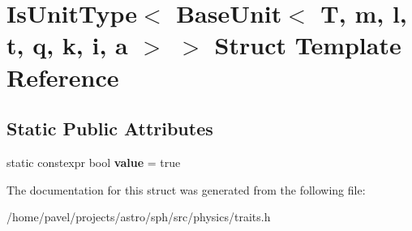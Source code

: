 \hypertarget{structIsUnitType_3_01BaseUnit_3_01T_00_01m_00_01l_00_01t_00_01q_00_01k_00_01i_00_01a_01_4_01_4}{}\section{Is\+Unit\+Type$<$ Base\+Unit$<$ T, m, l, t, q, k, i, a $>$ $>$ Struct Template Reference}
\label{structIsUnitType_3_01BaseUnit_3_01T_00_01m_00_01l_00_01t_00_01q_00_01k_00_01i_00_01a_01_4_01_4}
\subsection*{Static Public Attributes}
\begin{DoxyCompactItemize}
\item 
\hypertarget{structIsUnitType_3_01BaseUnit_3_01T_00_01m_00_01l_00_01t_00_01q_00_01k_00_01i_00_01a_01_4_01_4_a838d6c63bee6ee792d0195d20170b8f1}{}\label{structIsUnitType_3_01BaseUnit_3_01T_00_01m_00_01l_00_01t_00_01q_00_01k_00_01i_00_01a_01_4_01_4_a838d6c63bee6ee792d0195d20170b8f1} 
static constexpr bool {\bfseries value} = true
\end{DoxyCompactItemize}


The documentation for this struct was generated from the following file\+:\begin{DoxyCompactItemize}
\item 
/home/pavel/projects/astro/sph/src/physics/traits.\+h\end{DoxyCompactItemize}
